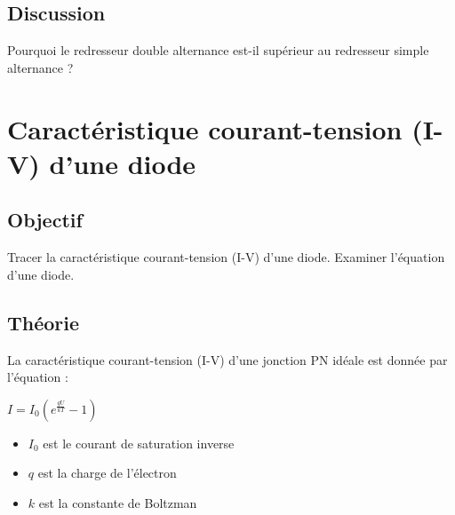\documentclass{book}
\begin{document}
\subsection{Discussion}


Pourquoi le redresseur double alternance est-il supérieur au redresseur simple alternance ?







\section{Caractéristique courant-tension (I-V) d'une diode}



\subsection{Objectif}


Tracer la caractéristique courant-tension (I-V) d'une diode. Examiner l'équation d'une diode.

\subsection{Théorie}


La caractéristique courant-tension (I-V) d'une jonction PN idéale est donnée par l'équation :



$I=I_{0}\left(e^{\frac{qU}{kT} }-1\right)$



\begin{itemize}
  \item $I_{0}$ est le courant de saturation inverse
\end{itemize}



\begin{itemize}
  \item $q$ est la charge de l'électron
\end{itemize}



\begin{itemize}
  \item $k$ est la constante de Boltzman
\end{itemize}
\end{document}
